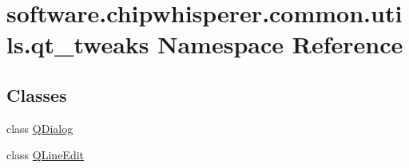\hypertarget{namespacesoftware_1_1chipwhisperer_1_1common_1_1utils_1_1qt__tweaks}{}\section{software.\+chipwhisperer.\+common.\+utils.\+qt\+\_\+tweaks Namespace Reference}
\label{namespacesoftware_1_1chipwhisperer_1_1common_1_1utils_1_1qt__tweaks}
\subsection*{Classes}
\begin{DoxyCompactItemize}
\item 
class \hyperlink{classsoftware_1_1chipwhisperer_1_1common_1_1utils_1_1qt__tweaks_1_1QDialog}{Q\+Dialog}
\item 
class \hyperlink{classsoftware_1_1chipwhisperer_1_1common_1_1utils_1_1qt__tweaks_1_1QLineEdit}{Q\+Line\+Edit}
\end{DoxyCompactItemize}
